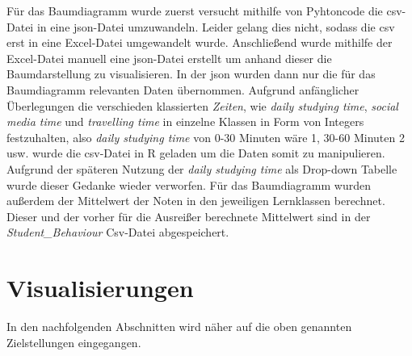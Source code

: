 \documentclass[usegeometry=true]{scrartcl}
\begin{document}
\noindent Für das Baumdiagramm wurde zuerst versucht mithilfe von Pyhtoncode die csv-Datei in eine json-Datei umzuwandeln. Leider gelang dies nicht, sodass die csv erst in eine Excel-Datei umgewandelt wurde. Anschließend wurde mithilfe der Excel-Datei manuell eine json-Datei erstellt um anhand dieser die Baumdarstellung zu visualisieren. In der json wurden dann nur die für das Baumdiagramm relevanten Daten übernommen. Aufgrund anfänglicher Überlegungen die verschieden klassierten \textit{Zeiten}, wie \textit{daily studying time}, \textit{social media time} und \textit{travelling time} in einzelne Klassen in Form von Integers festzuhalten, also \textit{daily studying time} von 0-30 Minuten wäre 1, 30-60 Minuten 2 usw. wurde die csv-Datei in R geladen um die Daten somit zu manipulieren. Aufgrund der späteren Nutzung der \textit{daily studying time} als Drop-down Tabelle wurde dieser Gedanke wieder verworfen.
Für das Baumdiagramm wurden außerdem der Mittelwert der Noten in den jeweiligen Lernklassen berechnet.
Dieser und der vorher für die Ausreißer berechnete Mittelwert sind in der \textit{Student\_Behaviour} Csv-Datei abgespeichert.
\\

\section{Visualisierungen}
\label{gross3}
In den nachfolgenden Abschnitten wird näher auf die oben genannten Zielstellungen eingegangen.
\end{document}
